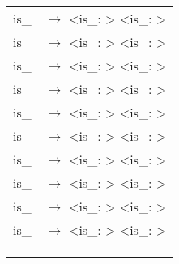 \documentclass[a4paper]{article}
\begin{document}
\begin{tabular}{ll}
	is\_ & $\to$ <is\_: > <is\_: > \\
	is\_ & $\to$ <is\_: > <is\_: > \\
	is\_ & $\to$ <is\_: > <is\_: > \\
	is\_ & $\to$ <is\_: > <is\_: > \\
	is\_ & $\to$ <is\_: > <is\_: > \\
	is\_ & $\to$ <is\_: > <is\_: > \\
	is\_ & $\to$ <is\_: > <is\_: > \\
	is\_ & $\to$ <is\_: > <is\_: > \\
	is\_ & $\to$ <is\_: > <is\_: > \\
	is\_ & $\to$ <is\_: > <is\_: > \\
\begin{comment}

\end{comment}


\begin{comment}



\end{comment}

	& \\
	& \\ %
	& \\


\end{tabular}
\end{document}
